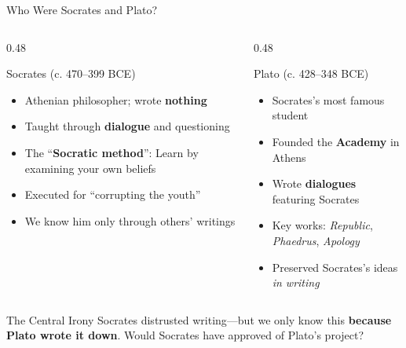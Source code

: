 \documentclass[aspectratio=169,11pt]{beamer}
\begin{document}
\begin{frame}[shrink=8]{Who Were Socrates and Plato?}
\begin{columns}
\begin{column}{0.48\textwidth}
\begin{block}{Socrates (c. 470--399 BCE)}
\begin{itemize}
  \item Athenian philosopher; wrote \textbf{nothing}
  \item Taught through \textbf{dialogue} and questioning
  \item The ``\textbf{Socratic method}'': Learn by examining your own beliefs
  \item Executed for ``corrupting the youth''
  \item We know him only through others' writings
\end{itemize}
\end{block}
\end{column}

\begin{column}{0.48\textwidth}
\begin{exampleblock}{Plato (c. 428--348 BCE)}
\begin{itemize}
  \item Socrates's most famous student
  \item Founded the \textbf{Academy} in Athens
  \item Wrote \textbf{dialogues} featuring Socrates
  \item Key works: \textit{Republic}, \textit{Phaedrus}, \textit{Apology}
  \item Preserved Socrates's ideas \textit{in writing}
\end{itemize}
\end{exampleblock}
\end{column}
\end{columns}

\vspace{0.5em}
\begin{alertblock}{The Central Irony}
Socrates distrusted writing---but we only know this \textbf{because Plato wrote it down}. Would Socrates have approved of Plato's project?
\end{alertblock}
\end{frame}
\end{document}

